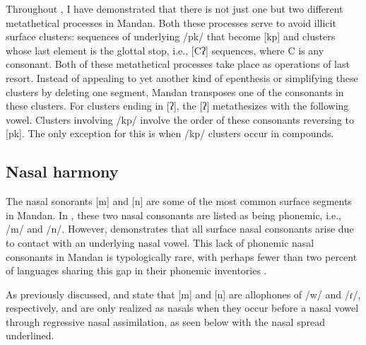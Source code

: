 Throughout , I have demonstrated that there is not just one but two different metathetical processes in Mandan. Both these processes serve to avoid illicit surface clusters: sequences of underlying /pk/ that become [kp] and clusters whose last element is the glottal stop, i.e., [Cʔ] sequences, where C is any consonant. Both of these metathetical processes take place as operations of last resort. Instead of appealing to yet another kind of epenthesis or simplifying these clusters by deleting one segment, Mandan transposes one of the consonants in these clusters. For clusters ending in [ʔ], the [ʔ] metathesizes with the following vowel. Clusters involving /kp/ involve the order of these consonants reversing to [pk]. The only exception for this is when /kp/ clusters occur in compounds.


\subsection{Nasal harmony}\label{nasalharmony}

The nasal sonorants [m] and [n] are some of the most common surface segments in Mandan. In \citet{kennard1936}, these two nasal consonants are listed as being phonemic, i.e., /m/ and /n/. However, \citet{hollow1970} demonstrates that all surface nasal consonants arise due to contact with an underlying nasal vowel. This lack of phonemic nasal consonants in Mandan is typologically rare, with perhaps fewer than two percent of languages sharing this gap in their phonemic inventories \citep{sampson1999,maddieson2013}.

As previously discussed, \citet{hollow1970} and \citet{mixco1997a} state that [m] and [n] are allophones of /w/ and /ɾ/, respectively, and are only realized as nasals when they occur before a nasal vowel through regressive nasal assimilation, as seen below with the nasal spread underlined.

